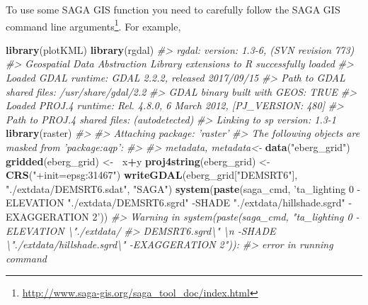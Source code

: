 \documentclass[graybox,natbib,nospthms,UStrade]{svmono}
\newenvironment{Shaded}{\begin{snugshade}}{\end{snugshade}}
\newcommand{\CommentTok}[1]{\textcolor[rgb]{0.37,0.37,0.37}{\textit{#1}}}
\newcommand{\ErrorTok}[1]{\textcolor[rgb]{0.14,0.14,0.14}{\textbf{#1}}}
\newcommand{\KeywordTok}[1]{\textcolor[rgb]{0.27,0.27,0.27}{\textbf{#1}}}
\newcommand{\NormalTok}[1]{#1}
\newcommand{\OperatorTok}[1]{\textcolor[rgb]{0.43,0.43,0.43}{\textbf{#1}}}
\newcommand{\StringTok}[1]{\textcolor[rgb]{0.5,0.5,0.5}{#1}}
\renewcommand{\href}[2]{#2 (\url{#1})}
\renewcommand{\href}[2]{#2\footnote{\url{#1}}}
\begin{document}
To use some SAGA GIS function you need to carefully follow
the \href{http://www.saga-gis.org/saga_tool_doc/index.html}{SAGA GIS command line arguments}. For example,

\begin{Shaded}
\begin{Highlighting}[]
\KeywordTok{library}\NormalTok{(plotKML)}
\KeywordTok{library}\NormalTok{(rgdal)}
\CommentTok{#> rgdal: version: 1.3-6, (SVN revision 773)}
\CommentTok{#>  Geospatial Data Abstraction Library extensions to R successfully loaded}
\CommentTok{#>  Loaded GDAL runtime: GDAL 2.2.2, released 2017/09/15}
\CommentTok{#>  Path to GDAL shared files: /usr/share/gdal/2.2}
\CommentTok{#>  GDAL binary built with GEOS: TRUE }
\CommentTok{#>  Loaded PROJ.4 runtime: Rel. 4.8.0, 6 March 2012, [PJ_VERSION: 480]}
\CommentTok{#>  Path to PROJ.4 shared files: (autodetected)}
\CommentTok{#>  Linking to sp version: 1.3-1}
\KeywordTok{library}\NormalTok{(raster)}
\CommentTok{#> }
\CommentTok{#> Attaching package: 'raster'}
\CommentTok{#> The following objects are masked from 'package:aqp':}
\CommentTok{#> }
\CommentTok{#>     metadata, metadata<-}
\KeywordTok{data}\NormalTok{(}\StringTok{"eberg_grid"}\NormalTok{)}
\KeywordTok{gridded}\NormalTok{(eberg_grid) <-}\StringTok{ }\ErrorTok{~}\NormalTok{x}\OperatorTok{+}\NormalTok{y}
\KeywordTok{proj4string}\NormalTok{(eberg_grid) <-}\StringTok{ }\KeywordTok{CRS}\NormalTok{(}\StringTok{"+init=epsg:31467"}\NormalTok{)}
\KeywordTok{writeGDAL}\NormalTok{(eberg_grid[}\StringTok{"DEMSRT6"}\NormalTok{], }\StringTok{"./extdata/DEMSRT6.sdat"}\NormalTok{, }\StringTok{"SAGA"}\NormalTok{)}
\KeywordTok{system}\NormalTok{(}\KeywordTok{paste}\NormalTok{(saga_cmd, }\StringTok{'ta_lighting 0 -ELEVATION "./extdata/DEMSRT6.sgrd" }
\StringTok{             -SHADE "./extdata/hillshade.sgrd" -EXAGGERATION 2'}\NormalTok{))}
\CommentTok{#> Warning in system(paste(saga_cmd, "ta_lighting 0 -ELEVATION \textbackslash{}"./extdata/}
\CommentTok{#> DEMSRT6.sgrd\textbackslash{}" \textbackslash{}n -SHADE \textbackslash{}"./extdata/hillshade.sgrd\textbackslash{}" -EXAGGERATION 2")):}
\CommentTok{#> error in running command}
\end{Highlighting}
\end{Shaded}
\end{document}
